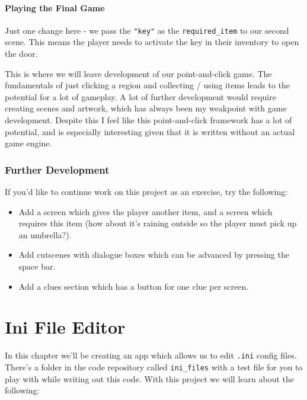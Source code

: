 \documentclass[a4paper,11pt,openany]{book}
\begin{document}
\subsubsection{Playing the Final Game}

Just one change here - we pass the \lstinline[columns=fixed]{"key"} as the \lstinline[columns=fixed]{required_item} to our second scene. This means the player needs to activate the key in their inventory to open the door. 

\vspace{5mm}

This is where we will leave development of our point-and-click game. The fundamentals of just clicking a region and collecting / using items leads to the potential for a lot of gameplay. A lot of further development would require creating scenes and artwork, which has always been my weakpoint with game development. Despite this I feel like this point-and-click framework has a lot of potential, and is especially interesting given that it is written without an actual game engine. 

\subsection{Further Development}

If you'd like to continue work on this project as an exercise, try the following:

\begin{itemize}
  \item Add a screen which gives the player another item, and a screen which requires this item (how about it's raining outside so the player must pick up an umbrella?).
  \item Add cutscenes with dialogue boxes which can be advanced by pressing the space bar.
  \item Add a clues section which has a button for one clue per screen.
\end{itemize} 

\chapter{Ini File Editor}
In this chapter we'll be creating an app which allows us to edit \lstinline[columns=fixed]{.ini} config files. There's a folder in the code repository called \lstinline[columns=fixed]{ini_files} with a test file for you to play with while writing out this code. With this project we will learn about the following:
\end{document}
